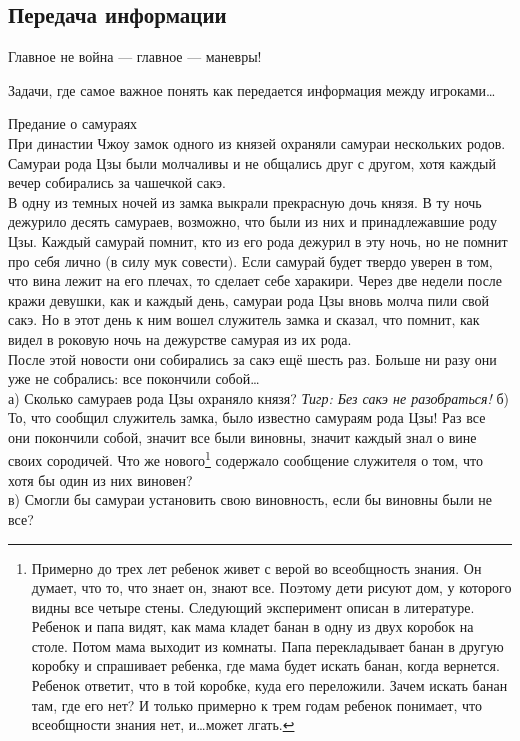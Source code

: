 


\subsection{Передача информации}

Главное не война — главное — маневры!


Задачи, где самое важное понять как передается информация между игроками\ldots



\begin{problem}
 Предание о самураях \\
При династии Чжоу замок одного из князей охраняли самураи нескольких родов. Самураи рода Цзы были молчаливы и не общались друг с другом, хотя каждый вечер собирались за чашечкой сакэ.\\
В одну из темных ночей из замка выкрали прекрасную дочь князя. В ту ночь дежурило десять самураев, возможно, что были из них и принадлежавшие роду Цзы. Каждый самурай помнит, кто из его рода дежурил в эту ночь, но не помнит про себя лично (в силу мук совести). Если самурай будет твердо уверен в том, что вина лежит на его плечах, то сделает себе харакири.
Через две недели после кражи девушки, как и каждый день, самураи рода Цзы вновь молча пили свой сакэ. Но в этот день к ним вошел служитель замка и сказал, что помнит, как видел в роковую ночь на дежурстве самурая из их рода.\\
После этой новости они собирались за сакэ ещё шесть раз. Больше ни разу они уже не собрались: все покончили собой\ldots \\
а) Сколько самураев рода Цзы охраняло князя? {\it Тигр: Без сакэ не разобраться!}
б) То, что сообщил служитель замка, было известно  самураям рода Цзы! Раз все они покончили собой, значит все были виновны, значит каждый знал о вине своих сородичей. Что же нового\footnote{ Примерно до трех лет ребенок живет с верой во всеобщность знания. Он думает, что то, что знает он, знают все. Поэтому дети рисуют дом, у которого видны все четыре стены. Следующий эксперимент описан в литературе. Ребенок и папа видят, как мама кладет банан в одну из двух коробок на столе. Потом мама выходит из комнаты. Папа перекладывает банан в другую коробку и спрашивает ребенка, где мама будет искать банан, когда вернется. Ребенок ответит, что в той коробке, куда его переложили. Зачем искать банан там, где его нет? И только примерно к трем годам ребенок понимает, что всеобщности знания нет, и\ldots может лгать.} содержало сообщение служителя о том, что хотя бы один из них виновен? \\
в) Смогли бы самураи установить свою виновность, если бы виновны были не все?



\begin{sol}

\end{sol}
\end{problem}




